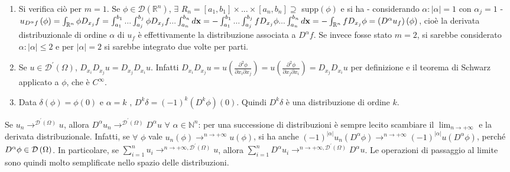 \documentclass{article}
\begin{document}
\begin{enumerate}
\item Si verifica ci\`{o} per $m=1$. Se $\phi \in \mathcal{D}\left( 
\mathbb{R}
^{n}\right) $, $\exists $ $R_{n}=\left[ a_{1},b_{1}\right] \times ...\times %
\left[ a_{n},b_{n}\right] \supseteq $ supp$\left( \phi \right) $ e si ha -
considerando $\alpha :\left\vert \alpha \right\vert =1$ con $\alpha _{j}=1$
- $u_{D^{\alpha }f}\left( \phi \right) =\int_{%
\mathbb{R}
^{n}}\phi D_{x_{j}}f=\int_{a_{1}}^{b_{1}}...\int_{a_{j}}^{b_{j}}\phi
D_{x_{j}}f...\int_{a_{n}}^{b_{n}}d\mathbf{x}=-\int_{a_{1}}^{b_{1}}...%
\int_{a_{j}}^{b_{j}}fD_{x_{j}}\phi ...\int_{a_{n}}^{b_{n}}d\mathbf{x=-}\int_{%
\mathbb{R}
^{n}}fD_{x_{j}}\phi =\left( D^{\alpha }u_{f}\right) \left( \phi \right) $,
cio\`{e} la derivata distribuzionale di ordine $\alpha $ di $u_{f}$ \`{e}
effettivamente la distribuzione associata a $D^{\alpha }f$. Se invece fosse
stato $m=2$, si sarebbe considerato $\alpha :\left\vert \alpha \right\vert
\leq 2$ e per $\left\vert \alpha \right\vert =2$ si sarebbe integrato due
volte per parti.

\item Se $u\in \mathcal{D}^{\prime }\left( \Omega \right) $, $%
D_{x_{i}}D_{x_{j}}u=D_{x_{j}}D_{x_{i}}u$. Infatti $D_{x_{i}}D_{x_{j}}u=u%
\left( \frac{\partial ^{2}\phi }{\partial x_{i}\partial x_{j}}\right)
=u\left( \frac{\partial ^{2}\phi }{\partial x_{j}\partial x_{i}}\right)
=D_{x_{j}}D_{x_{i}}u$ per definizione e il teorema di Schwarz applicato a $%
\phi $, che \`{e} $C^{\infty }$.

\item Data $\delta \left( \phi \right) =\phi \left( 0\right) $ e $\alpha =k$%
, $D^{k}\delta =\left( -1\right) ^{k}\left( D^{k}\phi \right) \left(
0\right) $. Quindi $D^{k}\delta $ \`{e} una distribuzione di ordine $k$.
\end{enumerate}

Se $u_{n}\rightarrow ^{\mathcal{D}^{\prime }\left( \Omega \right) }u$,
allora $D^{\alpha }u_{n}\rightarrow ^{\mathcal{D}^{\prime }\left( \Omega
\right) }D^{\alpha }u$ $\forall $ $\alpha \in 
\mathbb{N}
^{n}$: per una successione di distribuzioni \`{e} sempre lecito scambiare il 
$\lim_{n\rightarrow +\infty }$ e la derivata distribuzionale. Infatti, se $%
\forall $ $\phi $ vale $u_{n}\left( \phi \right) \rightarrow ^{n\rightarrow
+\infty }u\left( \phi \right) $, si ha anche $\left( -1\right) ^{\left\vert
\alpha \right\vert }u_{n}\left( D^{\alpha }\phi \right) \rightarrow
^{n\rightarrow +\infty }\left( -1\right) ^{\left\vert \alpha \right\vert
}u\left( D^{\alpha }\phi \right) $, perch\'{e} $D^{\alpha }\phi \in \mathcal{%
D}\left( \Omega \right) $. In particolare, se $\sum_{i=1}^{n}u_{i}%
\rightarrow ^{n\rightarrow +\infty ,\mathcal{D}^{\prime }\left( \Omega
\right) }u$, allora $\sum_{i=1}^{n}D^{\alpha }u_{i}\rightarrow
^{n\rightarrow +\infty ,\mathcal{D}^{\prime }\left( \Omega \right)
}D^{\alpha }u$. Le operazioni di passaggio al limite sono quindi molto
semplificate nello spazio delle distribuzioni.
\end{document}
